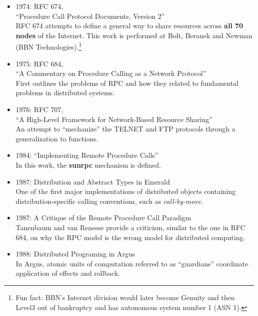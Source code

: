 \begin{itemize}

\item{1974:} RFC 674, \\ ``Procedure Call Protocol Documents, Version 2'' \\
	RFC 674 attempts to define a general way to share resources across \textbf{all 70 nodes} of the Internet.  This work is performed at Bolt, Beranek and Newman (BBN Technologies).\footnote{Fun fact: BBN's Internet division would later become Genuity and then Level3 out of bankruptcy and has autonomous system number 1 (ASN 1).}

\item{1975:} RFC 684, \\ ``A Commentary on Procedure Calling as a Network Protocol'' \\
	First outlines the problems of RPC and how they related to fundamental problems in distributed systems.

\item{1976:} RFC 707, \\ ``A High-Level Framework for Network-Based Resource Sharing'' \\
	An attempt to ``mechanize'' the TELNET and FTP protocols through a generalization to functions.

\item{1984:} ``Implementing Remote Procedure Calls''~\cite{birrell1984implementing} \\
	In this work, the \textbf{sunrpc} mechanism is defined.

\item{1987:} Distribution and Abstract Types in Emerald~\cite{1702134} \\
	One of the first major implementations of distributed objects containing distribution-specific calling conventions, such as \textit{call-by-move}.
	
\item{1987:} A Critique of the Remote Procedure Call Paradigm~\cite{tanenbaum1987critique} \\
	Tanenbaum and van Renesse provide a criticism, similar to the one in RFC 684, on why the RPC model is the wrong model for distributed computing.

\item{1988:} Distributed Programing in Argus~\cite{liskov1988distributed} \\
	In Argus, atomic units of computation referred to as ``guardians'' coordinate application of effects and rollback.


\end{itemize}
